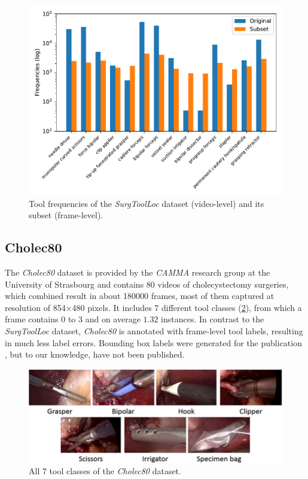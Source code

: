 \begin{figure}[h]
	\centering
	\includegraphics[width=15cm]{4_experiments/images/surgtoolloc_frequencies.pdf}
	\caption{Tool frequencies of the \emph{SurgToolLoc} dataset (video-level) and its subset (frame-level).}
	\label{fig:surgtoolloc_tool_frequencies}
\end{figure}

\subsection{Cholec80}
The \emph{Cholec80} dataset \cite{endonet} is provided by the \emph{CAMMA} research group at the University of Strasbourg and contains 80 videos of cholecystectomy surgeries, which combined result in about \num{180000} frames, most of them captured at resolution of 854$\times$480 pixels. It includes 7 different tool classes (\ref{fig:cholec80_tools}), from which a frame contains 0 to 3 and on average $1.32$ instances. In contrast to the \emph{SurgToolLoc} dataset, \emph{Cholec80} is annotated with frame-level tool labels, resulting in much less label errors. Bounding box labels were generated for the publication \cite{Vardazaryan}, but to our knowledge, have not been published.

\begin{figure}[h]
	\centering
	\includegraphics[width=13cm]{4_experiments/images/cholec80_tools.jpg}
	\caption{All 7 tool classes of the \emph{Cholec80} dataset.}
	\label{fig:cholec80_tools}
\end{figure}

